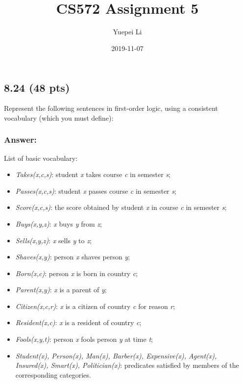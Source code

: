 \documentclass{article}
\title{CS572 Assignment 5}
\author{Yuepei Li}
\date{2019-11-07}
\begin{document}
\maketitle

\subsection*{8.24 (48 pts)}

Represent the following sentences in first-order logic, using a consistent vocabulary (which you must define):

\subsubsection*{Answer:}

List of basic vocabulary:

\begin{itemize}
  \item \textit{Takes(x,c,s)}: student \textit{x} takes course \textit{c} in semester \textit{s};
  \item \textit{Passes(x,c,s)}: student \textit{x} passes course \textit{c} in semester \textit{s};
  \item \textit{Score(x,c,s)}: the score obtained by student \textit{x} in course \textit{c} in semester \textit{s};

  \item \textit{Buys(x,y,z)}: \textit{x} buys \textit{y} from \textit{z};
  \item \textit{Sells(x,y,z)}: \textit{x} sells \textit{y} to \textit{z};
  \item \textit{Shaves(x,y)}: person \textit{x} shaves person \textit{y};
  \item \textit{Born(x,c)}: person \textit{x} is born in country \textit{c};
  \item \textit{Parent(x,y)}: \textit{x} is a parent of \textit{y};
  \item \textit{Citizen(x,c,r)}: \textit{x} is a citizen of country \textit{c} for reason \textit{r};
  \item \textit{Resident(x,c)}: \textit{x} is a resident of country \textit{c};
  \item \textit{Fools(x,y,t)}: person \textit{x} fools person \textit{y} at time \textit{t};
  \item \textit{Student(x), Person(x), Man(x), Barber(x), Expensive(x), Agent(x), Insured(x), Smart(x), Politician(x)}: predicates satisﬁed by members of the corresponding categories.
\end{itemize}
\end{document}

